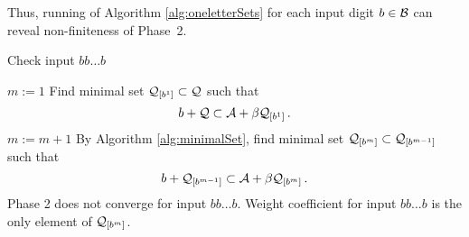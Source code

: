 Thus, running of Algorithm \ref{alg:oneletterSets} for each input digit $b\in\mathcal{B}$ can reveal non-finiteness of Phase~2.

\begin{algorithm}
  \caption{Check input $bb\dots b$}
    \label{alg:oneletterSets}
  \begin{algorithmic}[1]
    \STATE $m:=1$
    \STATE Find minimal set $\mathcal{Q}_{[b^{1}]} \subset \mathcal{Q}$ such that
      $$
      b + \mathcal{Q} \subset \mathcal{A} + \beta \mathcal{Q}_{[b^{1}]}\,.
      $$
      \vspace{-20pt}
        \STATE $m:= m +1$
        \STATE By Algorithm \ref{alg:minimalSet}, find minimal set $\mathcal{Q}_{[b^{m}]} \subset \mathcal{Q}_{[b^{m-1}]}$ such that
          $$
          b + \mathcal{Q}_{[b^{m-1}]} \subset \mathcal{A} + \beta \mathcal{Q}_{[b^{m}]}\,.
          $$  
          \vspace{-20pt}
            \RETURN Phase 2 does not converge for input $bb\dots b$.
        \ENDIF
    \ENDWHILE  
    \RETURN Weight coefficient for input $bb\dots b$ is the only element of $\mathcal{Q}_{[b^{m}]}$.
  \end{algorithmic}
\end{algorithm}


